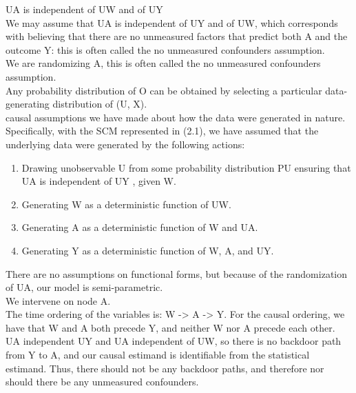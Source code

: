 UA is independent of UW and of UY \\

We may assume that UA is independent of UY and of UW, which corresponds with believing that there are no unmeasured factors that predict both A and the outcome Y: this is often called the no unmeasured confounders assumption. \\

We are randomizing A, this is often called the no unmeasured confounders assumption. \\

Any probability distribution of O can be obtained by selecting a particular data-generating distribution of (U, X). \\

causal assumptions we have made about how the data were generated in nature. Specifically, with the SCM represented in (2.1), we have assumed that the underlying data were generated by the following actions: \\


\begin{enumerate}
\item Drawing unobservable U from some probability distribution PU ensuring that UA is independent of UY , given W.
\item Generating W as a deterministic function of UW.
\item Generating A as a deterministic function of W and UA.
\item Generating Y as a deterministic function of W, A, and UY.
\end{enumerate} 

There are no assumptions on functional forms, but because of the randomization of UA, our model is semi-parametric.\\

We intervene on node A.\\

The time ordering of the variables is: W -> A -> Y. For the causal ordering, we have that W and A both precede Y, and neither W nor A precede each other.\\
                          
UA independent UY and UA independent of UW, so there is no backdoor path from Y to A, and our causal estimand is identifiable from the statistical estimand. Thus, there should not be any backdoor paths, and therefore nor should there be any unmeasured confounders.\\

